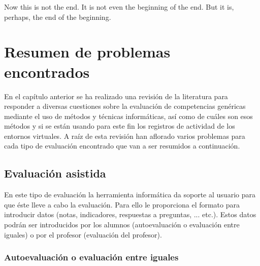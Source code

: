 

\begin{savequote}[50mm]
Now this is not the end. It is not even the beginning of the end. But it is, perhaps, the end of the beginning. 
\end{savequote}


\chapter{Resumen de problemas encontrados}
\label{cha:Problemas}

\ifpdf
    \graphicspath{{3_problemas/figures/PNG/}{3_problemas/figures/PDF/}{3_problemas/figures/}}
\else
    \graphicspath{{3_problemas/figures/EPS/}{3_problemas/figures/}}
\fi



En el capítulo anterior se ha realizado una revisión de la literatura para responder a diversas cuestiones sobre la evaluación de competencias genéricas mediante el uso de métodos y técnicas informáticas, así como de cuáles son esos métodos y si se están usando para este fin los registros de actividad de los entornos virtuales. A raíz de esta revisión han aflorado varios problemas para cada tipo de evaluación encontrado que van a ser resumidos a continuación.

\section{Evaluación asistida} %

En este tipo de evaluación la herramienta informática da soporte al usuario para que éste lleve a cabo la evaluación. Para ello le proporciona el formato para introducir datos (notas, indicadores, respuestas a preguntas, ... etc.). Estos datos podrán ser introducidos por los alumnos (autoevaluación o evaluación entre iguales) o por el profesor (evaluación del profesor).

\subsection{Autoevaluación o evaluación entre iguales}

